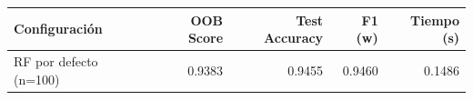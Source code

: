 \begin{tabular}{lrrrr}
\toprule
Configuración & OOB Score & Test Accuracy & F1 (w) & Tiempo (s) \\
\midrule
RF por defecto (n=100) & 0.9383 & 0.9455 & 0.9460 & 0.1486 \\
\bottomrule
\end{tabular}

